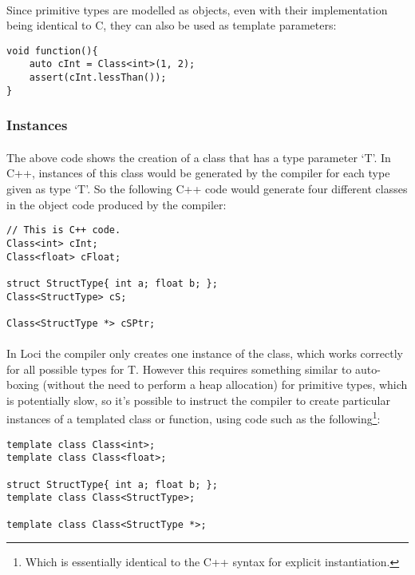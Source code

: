 \documentclass[12pt,twoside,notitlepage]{report}
\begin{document}
\paragraph{}
Since primitive types are modelled as objects, even with their implementation being identical to C, they can also be used as template parameters:

\begin{lstlisting}
void function(){
	auto cInt = Class<int>(1, 2);
	assert(cInt.lessThan());
}
\end{lstlisting}

\subsubsection{Instances}

\paragraph{}
The above code shows the creation of a class that has a type parameter `T'. In C++, instances of this class would be generated by the compiler for each type given as type `T'. So the following C++ code would generate four different classes in the object code produced by the compiler:

\begin{lstlisting}
// This is C++ code.
Class<int> cInt;
Class<float> cFloat;

struct StructType{ int a; float b; };
Class<StructType> cS;

Class<StructType *> cSPtr;
\end{lstlisting}


\paragraph{}
In Loci the compiler only creates one instance of the class, which works correctly for all possible types for T. However this requires something similar to auto-boxing (without the need to perform a heap allocation) for primitive types, which is potentially slow, so it's possible to instruct the compiler to create particular instances of a templated class or function, using code such as the following\footnote{Which is essentially identical to the C++ syntax for explicit instantiation.}:


\begin{lstlisting}
template class Class<int>;
template class Class<float>;

struct StructType{ int a; float b; };
template class Class<StructType>;

template class Class<StructType *>;
\end{lstlisting}
\end{document}
